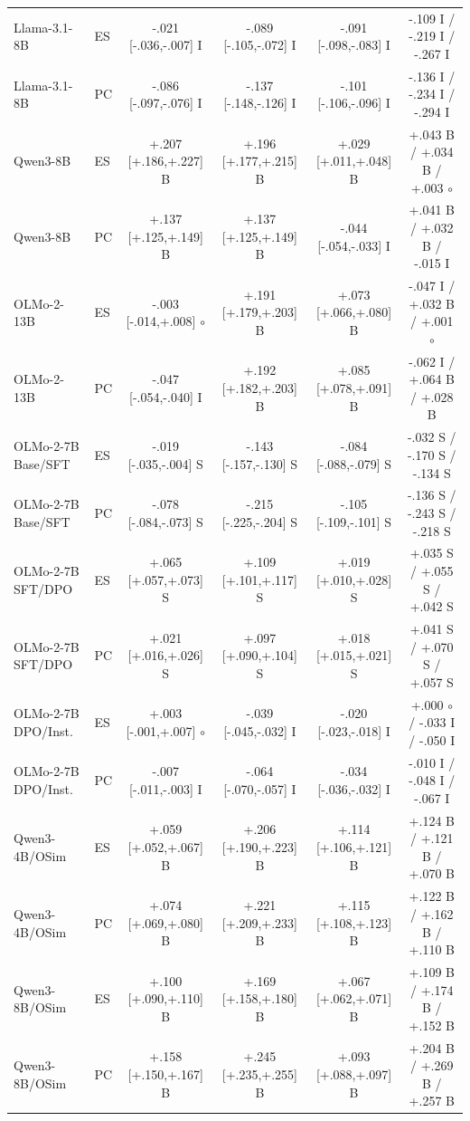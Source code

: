 \begin{table}[t]
\begin{tabular}{@{}llcccc@{}}
Llama-3.1-8B & ES & -.021 [-.036,-.007] I & -.089 [-.105,-.072] I & -.091 [-.098,-.083] I & -.109 I / -.219 I / -.267 I \\
Llama-3.1-8B & PC & -.086 [-.097,-.076] I & -.137 [-.148,-.126] I & -.101 [-.106,-.096] I & -.136 I / -.234 I / -.294 I \\
Qwen3-8B & ES & +.207 [+.186,+.227] B & +.196 [+.177,+.215] B & +.029 [+.011,+.048] B & +.043 B / +.034 B / +.003 $\circ$ \\
Qwen3-8B & PC & +.137 [+.125,+.149] B & +.137 [+.125,+.149] B & -.044 [-.054,-.033] I & +.041 B / +.032 B / -.015 I \\
OLMo-2-13B & ES & -.003 [-.014,+.008] $\circ$ & +.191 [+.179,+.203] B & +.073 [+.066,+.080] B & -.047 I / +.032 B / +.001 $\circ$ \\
OLMo-2-13B & PC & -.047 [-.054,-.040] I & +.192 [+.182,+.203] B & +.085 [+.078,+.091] B & -.062 I / +.064 B / +.028 B \\
OLMo-2-7B Base/SFT & ES & -.019 [-.035,-.004] S & -.143 [-.157,-.130] S & -.084 [-.088,-.079] S & -.032 S / -.170 S / -.134 S \\
OLMo-2-7B Base/SFT & PC & -.078 [-.084,-.073] S & -.215 [-.225,-.204] S & -.105 [-.109,-.101] S & -.136 S / -.243 S / -.218 S \\
OLMo-2-7B SFT/DPO & ES & +.065 [+.057,+.073] S & +.109 [+.101,+.117] S & +.019 [+.010,+.028] S & +.035 S / +.055 S / +.042 S \\
OLMo-2-7B SFT/DPO & PC & +.021 [+.016,+.026] S & +.097 [+.090,+.104] S & +.018 [+.015,+.021] S & +.041 S / +.070 S / +.057 S \\
OLMo-2-7B DPO/Inst. & ES & +.003 [-.001,+.007] $\circ$ & -.039 [-.045,-.032] I & -.020 [-.023,-.018] I & +.000 $\circ$ / -.033 I / -.050 I \\
OLMo-2-7B DPO/Inst. & PC & -.007 [-.011,-.003] I & -.064 [-.070,-.057] I & -.034 [-.036,-.032] I & -.010 I / -.048 I / -.067 I \\
Qwen3-4B/OSim & ES & +.059 [+.052,+.067] B & +.206 [+.190,+.223] B & +.114 [+.106,+.121] B & +.124 B / +.121 B / +.070 B \\
Qwen3-4B/OSim & PC & +.074 [+.069,+.080] B & +.221 [+.209,+.233] B & +.115 [+.108,+.123] B & +.122 B / +.162 B / +.110 B \\
Qwen3-8B/OSim & ES & +.100 [+.090,+.110] B & +.169 [+.158,+.180] B & +.067 [+.062,+.071] B & +.109 B / +.174 B / +.152 B \\
Qwen3-8B/OSim & PC & +.158 [+.150,+.167] B & +.245 [+.235,+.255] B & +.093 [+.088,+.097] B & +.204 B / +.269 B / +.257 B \\

\end{tabular}
\end{table}
